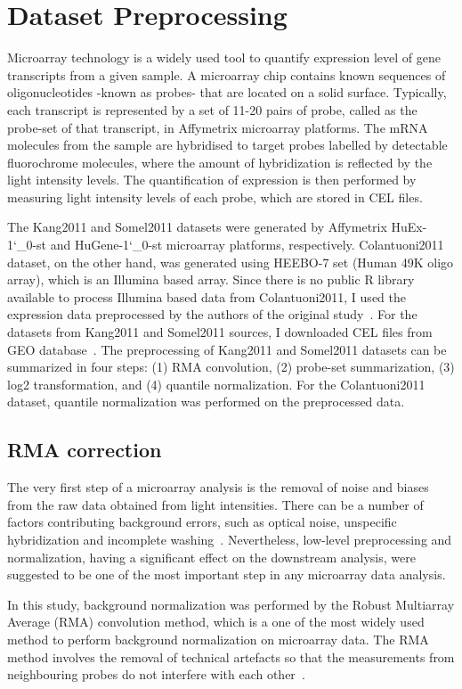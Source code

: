 \section{Dataset Preprocessing}
Microarray technology is a widely used tool to quantify expression level of gene transcripts from a given sample. 
A microarray chip contains known sequences of oligonucleotides -known as probes- that are located on a solid surface.
Typically, each transcript is represented by a set of 11-20 pairs of probe, called as the probe-set of that transcript, in Affymetrix microarray platforms.
The mRNA molecules from the sample are hybridised to target probes labelled by detectable fluorochrome molecules, 
where the amount of hybridization is reflected by the light intensity levels.
The quantification of expression is then performed by measuring light intensity levels of each probe, which are stored in CEL files.

The Kang2011 and Somel2011 datasets were generated by Affymetrix HuEx-1\char`_0-st and HuGene-1\char`_0-st microarray platforms, respectively. 
Colantuoni2011 dataset, on the other hand, was generated using HEEBO-7 set (Human 49K oligo array), which is an Illumina based array. 
Since there is no public R library available to process Illumina based data from Colantuoni2011, 
I used the expression data preprocessed by the authors of the original study~\cite{Colantuoni2011}. 
For the datasets from Kang2011 and Somel2011 sources, I downloaded CEL files from GEO database~\cite{Barrett2013}. 
The preprocessing of Kang2011 and Somel2011 datasets can be summarized in four steps: (1) RMA convolution, (2) probe-set summarization,
(3) log2 transformation, and (4) quantile normalization. For the Colantuoni2011 dataset, quantile normalization was performed on the preprocessed data.


\subsection{RMA correction}
The very first step of a microarray analysis is the removal of noise and biases from the raw data obtained from light intensities.
There can be a number of factors contributing background errors, such as optical noise, unspecific hybridization and incomplete washing~\cite{Bengtsson2006}. 
Nevertheless, low-level preprocessing and normalization, having a significant effect on the downstream analysis, 
were suggested to be one of the most important step in any microarray data analysis. 

In this study, background normalization was performed by the Robust Multiarray Average (RMA) convolution method, 
which is a one of the most widely used method to perform background normalization on microarray data. 
The RMA method involves the removal of technical artefacts so that the measurements from neighbouring probes do not interfere with each other~\cite{Irizarry2003}.

